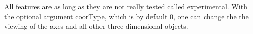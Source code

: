 \documentclass[a4paper]{scrreprt}
\begin{document}
All features are as long as they are not really tested called experimental. With the optional argument
coorType, which is by default 0, one can change the the viewing of the axes and all other three
dimensional objects.



\end{document}
